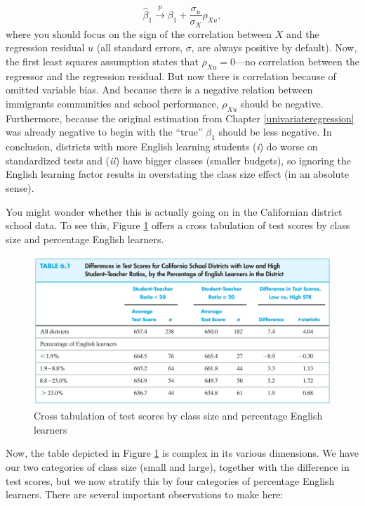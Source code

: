 \documentclass[
]{book}
\begin{document}
\begin{equation}
\hat{\beta}_1 \overset{p}{\to} \beta_1 + \frac{\sigma_u}{\sigma_X}\rho_{Xu},
\end{equation}
where you should focus on the sign of the correlation between \(X\) and the regression residual \(u\) (all standard errors, \(\sigma\), are always positive by default). Now, the first least squares assumption states that \(\rho_{Xu} = 0\)---no correlation between the regressor and the regression residual. But now there is correlation because of omitted variable bias. And because there is a negative relation between immigrants communities and school performance, \(\rho_{Xu}\) should be negative. Furthermore, because the original estimation from Chapter \ref{univariateregression} was already negative to begin with the ``true'' \(\beta_1\) should be less negative. In conclusion, districts with more English learning students (\emph{i}) do worse on standardized tests and (\emph{ii}) have bigger classes (smaller budgets), so ignoring the English learning factor results in overstating the class size effect (in an absolute sense).

You might wonder whether this is actually going on in the Californian district school data. To see this, Figure \ref{fig:omitca} offers a cross tabulation of test scores by class size and percentage English learners.

\begin{figure}

{\centering \includegraphics[width=800px]{./figures/Sheet7} 

}

\caption{Cross tabulation of test scores by class size and percentage English learners}\label{fig:omitca}
\end{figure}

Now, the table depicted in Figure \ref{fig:omitca} is complex in its various dimensions. We have our two categories of class size (small and large), together with the difference in test scores, but we now stratify this by four categories of percentage English learners. There are several important observations to make here:
\end{document}
